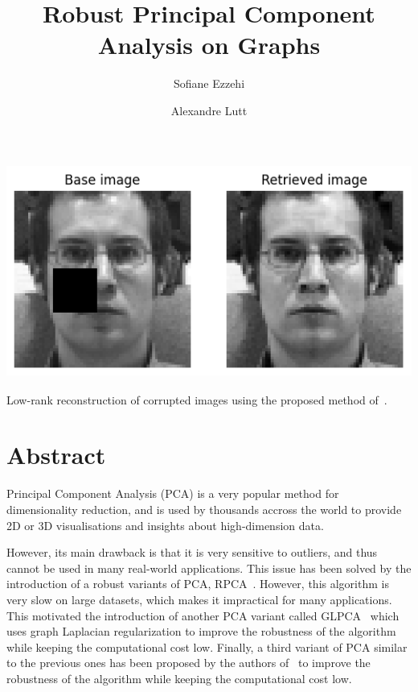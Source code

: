 \documentclass[sigconf]{acmart}
\begin{document}
\title{Robust Principal Component Analysis on Graphs}

\author{Sofiane Ezzehi}

\author{Alexandre Lutt}

\begin{teaserfigure}
  \center
  \includegraphics[width=15cm, height=7cm]{sampleteaser}
  \caption{Low-rank reconstruction of corrupted images using the proposed method of~\cite{main_paper}.}
  \label{fig:teaser}
\end{teaserfigure}

\maketitle
\pagestyle{plain}

\section{Abstract}

Principal Component Analysis (PCA) is a very popular method for dimensionality reduction, and is used by thousands accross the world to provide 2D or 3D visualisations and insights about high-dimension data.

However, its main drawback is that it is very sensitive to outliers, and thus cannot be used in many real-world applications.
This issue has been solved by the introduction of a robust variants of PCA, RPCA~\cite{rpca_paper}. However, this algorithm is very slow on large datasets, which makes it impractical for many applications. 
This motivated the introduction of another PCA variant called GLPCA~\cite{glpca_paper} which uses graph Laplacian regularization to improve the robustness of the algorithm while keeping the computational cost low.
Finally, a third variant of PCA similar to the previous ones has been proposed by the authors of~\cite{main_paper} to improve the robustness of the algorithm while keeping the computational cost low.
\end{document}
